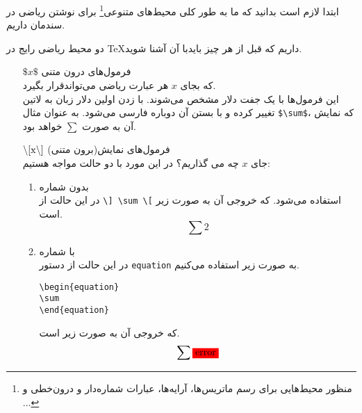 ابتدا لازم است بدانید که ما به طور کلی محیط‌های متنوعی\footnote{منظور محیط‌هایی برای رسم ماتریس‌ها، آرایه‌ها، عبارات شماره‌دار و درون‌خطی و ...} برای نوشتن ریاضی در سندمان داریم.

\begin{definition}
دو محیط ریاضی رایج در \TeX داریم که قبل از هر چیز بایدبا آن آشنا شوید.
\begin{enumerate}
\item[$\$x\$ $]
فرمول‌های درون متنی\\
که بجای $x$ هر عبارت ریاضی می‌تواندقرار بگیرد.\\   
این فرمول‌ها  با یک جفت دلار مشخص می‌شوند. با زدن اولین دلار زبان به لاتین تغییر کرده و با بستن آن دوباره فارسی می‌شود. به عنوان مثال \verb|$\sum$|، که نمایش آن به صورت $\sum$ خواهد بود.

\item[$\backslash\rm{[} x \backslash\rm{]}$]
فرمول‌های نمایش(برون متنی)\\
جای $x$ چه می گذاریم؟
در این مورد با دو حالت مواجه هستیم:
\begin{enumerate}[ا.]
\item
بدون شماره\\
در این حالت از \verb|\] \sum \[| استفاده می‌شود. که خروجی آن به صورت زیر است.
\[\sum2\]
\item
با شماره\\
در این حالت از دستور \verb|equation| به صورت زیر استفاده می‌کنیم.

\begin{LTR}
\begin{verbatim}
\begin{equation}
\sum
\end{equation}
\end{verbatim}
\end{LTR}
که خروجی آن به صورت زیر است.
\error
\begin{equation}
\sum\error
\end{equation}
\end{enumerate}
\end{enumerate}
\end{definition}


